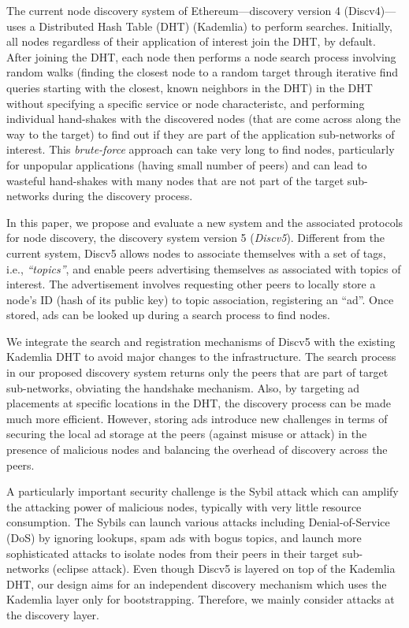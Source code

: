 The current node discovery system of Ethereum---\ie discovery version 4 (Discv4)---uses a Distributed Hash Table (DHT) (Kademlia) to perform searches. Initially, all nodes regardless of their application of interest join the DHT, by default. After joining the DHT, each node then performs a node search process involving random walks (\ie finding the closest node to a random target through iterative find queries starting with the closest, known neighbors in the DHT) in the DHT without specifying a specific service or node characteristc, and performing individual hand-shakes with the discovered nodes (that are come across along the way to the target) to find out if they are part of the application sub-networks of interest. This \emph{brute-force} approach can take very long to find nodes, particularly for unpopular applications (\ie having small number of peers) and can lead to wasteful hand-shakes with many nodes that are not part of the target sub-networks during the discovery process. 

In this paper, we propose and evaluate a new system and the associated protocols for node discovery, \ie the discovery system version 5 (\textit{Discv5}). Different from the current system, Discv5 allows nodes to associate themselves with a set of tags, i.e., \textit{``topics''}, and enable peers advertising themselves as associated with topics of interest. The advertisement involves requesting other peers to locally store a node's ID (hash of its public key) to topic association, \ie  registering an ``ad''. Once stored, ads can be looked up during a search process to find nodes. 

We integrate the search and registration mechanisms of Discv5 with the existing Kademlia DHT to avoid major changes to the infrastructure. The search process in our proposed discovery system returns only the peers that are part of target sub-networks, obviating the handshake mechanism. Also, by targeting ad placements at specific locations in the DHT, the discovery process can be made much more efficient. However, storing ads introduce new challenges in terms of securing the local ad storage at the peers (\ie against misuse or attack) in the presence of malicious nodes and balancing the overhead of discovery across the peers. 

A particularly important security challenge is the Sybil attack which can amplify the attacking power of malicious nodes, typically with very little resource consumption. The Sybils can launch various attacks including Denial-of-Service (DoS) by ignoring lookups, spam ads with bogus topics, and launch more sophisticated attacks to isolate nodes from their peers in their target sub-networks (\ie eclipse attack). Even though Discv5 is layered on top of the Kademlia DHT, our design aims for an independent discovery mechanism which uses the Kademlia layer only for bootstrapping. Therefore, we mainly consider attacks at the discovery layer.

